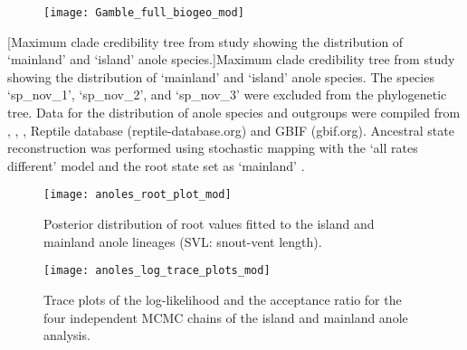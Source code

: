 \begin{figure}[h]
	\centering
	\texttt{[image: Gamble\_full\_biogeo\_mod]}
\end{figure}
\clearpage %
[Maximum clade credibility tree from \citet{gamble_anolis_2014} study showing the distribution of `mainland' and `island' anole species.]{Maximum clade credibility tree from \citet{gamble_anolis_2014} study showing the distribution of `mainland' and `island' anole species. The species `sp\_nov\_1', `sp\_nov\_2', and `sp\_nov\_3'  were excluded from the phylogenetic tree. Data for the distribution of anole species and outgroups were compiled from \citet{nicholson_mainland_2005}, \citet{losos_lizards_2009}, \citet{thomas_body_2009}, Reptile database (reptile-database.org) and GBIF (gbif.org). Ancestral state reconstruction was performed using stochastic mapping with the `all rates different' model and the root state set as `mainland' \citep{nicholson_mainland_2005, losos_lizards_2009}. }
\label{fig:biogeo_gamble}

\begin{figure}[h]
	\centering
	\texttt{[image: anoles\_root\_plot\_mod]}
	\caption[Posterior distribution of root values fitted to the island and mainland anole lineages.]{Posterior distribution of root values fitted to the island and mainland anole lineages (SVL: snout-vent length).}
	\label{fig:sup_root_anoles}
\end{figure}

\begin{figure}[h]
	\centering
	\texttt{[image: anoles\_log\_trace\_plots\_mod]}
	\caption[Trace plots of the log-likelihood and the acceptance ratio for the four independent MCMC chains of the island and mainland anole analysis.]{Trace plots of the log-likelihood and the acceptance ratio for the four independent MCMC chains of the island and mainland anole analysis. }
	\label{fig:sup_trace_anoles}
\end{figure}


